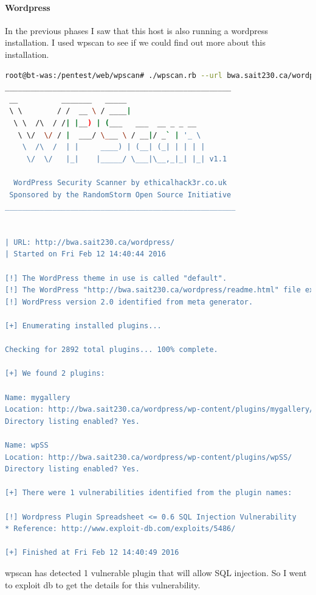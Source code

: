 \documentclass{article}
\begin{document}
\newpage
\paragraph{Wordpress}

In the previous phases I saw that this host is also running a wordpress
installation. I used wpscan to see if we could find out more about this installation.

\begin{lstlisting}[language=Bash, firstline=26, lastline=39]
root@bt-was:/pentest/web/wpscan# ./wpscan.rb --url bwa.sait230.ca/wordpress --enumerate p
____________________________________________________
 __          _______   _____                  
 \ \        / /  __ \ / ____|                 
  \ \  /\  / /| |__) | (___   ___  __ _ _ __  
   \ \/  \/ / |  ___/ \___ \ / __|/ _` | '_ \ 
    \  /\  /  | |     ____) | (__| (_| | | | |
     \/  \/   |_|    |_____/ \___|\__,_|_| |_| v1.1

  WordPress Security Scanner by ethicalhack3r.co.uk
 Sponsored by the RandomStorm Open Source Initiative
_____________________________________________________


| URL: http://bwa.sait230.ca/wordpress/
| Started on Fri Feb 12 14:40:44 2016

[!] The WordPress theme in use is called "default".
[!] The WordPress "http://bwa.sait230.ca/wordpress/readme.html" file exists.
[!] WordPress version 2.0 identified from meta generator.

[+] Enumerating installed plugins...

Checking for 2892 total plugins... 100% complete.

[+] We found 2 plugins:

Name: mygallery
Location: http://bwa.sait230.ca/wordpress/wp-content/plugins/mygallery/
Directory listing enabled? Yes.

Name: wpSS
Location: http://bwa.sait230.ca/wordpress/wp-content/plugins/wpSS/
Directory listing enabled? Yes.

[+] There were 1 vulnerabilities identified from the plugin names:

[!] Wordpress Plugin Spreadsheet <= 0.6 SQL Injection Vulnerability
* Reference: http://www.exploit-db.com/exploits/5486/

[+] Finished at Fri Feb 12 14:40:49 2016
\end{lstlisting}

\newpage
wpscan has detected 1 vulnerable plugin that will allow SQL injection. So I went
to exploit db to get the details for this vulnerability.
\end{document}
